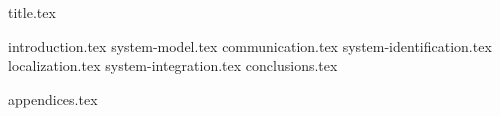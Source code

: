 \documentclass[final]{scrreprt} %
\begin{document}

{title.tex}
\newpage
\tableofcontents

\newpage
{}
{introduction.tex}
{system-model.tex}
{communication.tex}
{system-identification.tex}
{localization.tex}
{system-integration.tex}
{conclusions.tex}
\newpage
{}

\printbibliography
{appendices.tex}
\end{document}
